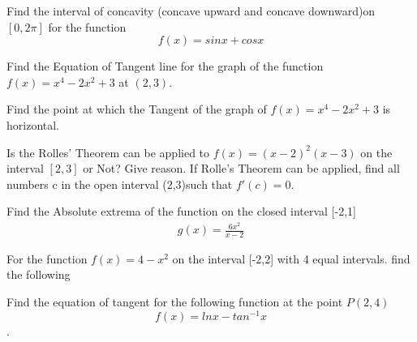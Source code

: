 \documentclass[11pt]{exam}
\begin{document}
\begin{questions}
\vspace{10cm}
\addpoints
\question[4] Find the interval of concavity (concave upward and concave downward)on $[0,2\pi]$ for the function 
\[f(x)=sinx+cosx\] 




\vspace{10cm}
\addpoints
\question[4] Find the Equation of Tangent line for the graph of the function $f(x)=x^4-2x^2+3$  at $(2,3)$.  


\vspace{9cm}
\addpoints
\question[4] Find the point at which the Tangent of the graph of $f(x)=x^4-2x^2+3$ is horizontal.

\newpage
\addpoints
\question[4] Is the Rolles' Theorem can be applied to $f(x)=(x-2)^2(x-3)$  on the interval $[2,3]$ or Not? Give reason.  If Rolle's Theorem can be applied, find all numbers c in the open interval (2,3)such that $f'(c)=0$.

\newpage
\addpoints
\question[4]Find the Absolute extrema of the function on the closed interval [-2,1]
\begin{align*}
g(x)=\frac{6x^2}{x-2}
\end{align*}

\vspace{10cm}
\addpoints
\question[6] For the function $f(x)=4-x^2$ on the interval [-2,2] with 4 equal intervals. find the following 


\vspace{8cm}
\noaddpoints
\question[5 Bonus] Find the equation of tangent for the following function at the point $P(2, 4)$\[f(x)=lnx-tan^{-1}x\].
\end{questions}
\end{document}

